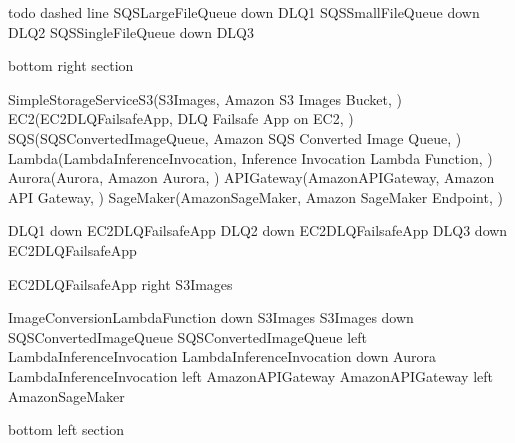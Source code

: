 \documentclass[letterpaper,10pt,english]{sphinxmanual}
\begin{document}
\begin{sphinxVerbatim}[commandchars=\\\{\},numbers=left,firstnumber=1,stepnumber=1]
\PYGZsq{}todo dashed line
SQSLargeFileQueue \PYGZhy{}down\PYGZhy{}\PYGZgt{} DLQ1
SQSSmallFileQueue \PYGZhy{}down\PYGZhy{}\PYGZgt{} DLQ2
SQSSingleFileQueue \PYGZhy{}down\PYGZhy{}\PYGZgt{} DLQ3


\PYGZsq{}bottom right section 
\PYGZsq{}\PYGZhy{}\PYGZhy{}\PYGZhy{}\PYGZhy{}\PYGZhy{}\PYGZhy{}\PYGZhy{}\PYGZhy{}\PYGZhy{}\PYGZhy{}\PYGZhy{}\PYGZhy{}\PYGZhy{}\PYGZhy{}\PYGZhy{}\PYGZhy{}\PYGZhy{}\PYGZhy{}\PYGZhy{}\PYGZhy{}\PYGZhy{}\PYGZhy{}\PYGZhy{}\PYGZhy{}\PYGZhy{}\PYGZhy{}\PYGZhy{}\PYGZhy{}\PYGZhy{}\PYGZhy{}\PYGZhy{}\PYGZhy{}\PYGZhy{}\PYGZhy{}\PYGZhy{}\PYGZhy{}\PYGZhy{}\PYGZhy{}\PYGZhy{}\PYGZhy{}\PYGZhy{}\PYGZhy{}\PYGZhy{}\PYGZhy{}\PYGZhy{}\PYGZhy{}\PYGZhy{}\PYGZhy{}\PYGZhy{}\PYGZhy{}\PYGZhy{}\PYGZhy{}\PYGZhy{}\PYGZhy{}\PYGZhy{}\PYGZhy{}\PYGZhy{}\PYGZhy{}\PYGZhy{}\PYGZhy{}\PYGZhy{}

SimpleStorageServiceS3(S3Images, \PYGZdq{}Amazon S3 Images Bucket\PYGZdq{}, \PYGZdq{} \PYGZdq{})
EC2(EC2DLQFailsafeApp, \PYGZdq{}DLQ Failsafe App on EC2\PYGZdq{}, \PYGZdq{} \PYGZdq{})
SQS(SQSConvertedImageQueue, \PYGZdq{}Amazon SQS Converted Image Queue\PYGZdq{}, \PYGZdq{} \PYGZdq{})
Lambda(LambdaInferenceInvocation, \PYGZdq{}Inference Invocation Lambda Function\PYGZdq{}, \PYGZdq{} \PYGZdq{})
Aurora(Aurora, \PYGZdq{}Amazon Aurora\PYGZdq{}, \PYGZdq{} \PYGZdq{})
APIGateway(AmazonAPIGateway, \PYGZdq{}Amazon API Gateway\PYGZdq{}, \PYGZdq{}\PYGZdq{})
SageMaker(AmazonSageMaker, \PYGZdq{}Amazon SageMaker Endpoint\PYGZdq{}, \PYGZdq{}\PYGZdq{})

DLQ1 \PYGZhy{}down\PYGZhy{}\PYGZgt{} EC2DLQFailsafeApp
DLQ2 \PYGZhy{}down\PYGZhy{}\PYGZgt{} EC2DLQFailsafeApp
DLQ3 \PYGZhy{}down\PYGZhy{}\PYGZgt{} EC2DLQFailsafeApp

EC2DLQFailsafeApp \PYGZhy{}right\PYGZhy{}\PYGZgt{} S3Images

ImageConversionLambdaFunction \PYGZhy{}down\PYGZhy{}\PYGZgt{} S3Images
S3Images \PYGZhy{}down\PYGZhy{}\PYGZgt{} SQSConvertedImageQueue
SQSConvertedImageQueue \PYGZhy{}left\PYGZhy{}\PYGZgt{} LambdaInferenceInvocation
LambdaInferenceInvocation \PYGZhy{}down\PYGZhy{}\PYGZgt{} Aurora
LambdaInferenceInvocation \PYGZlt{}\PYGZhy{}left\PYGZhy{}\PYGZgt{} AmazonAPIGateway
AmazonAPIGateway \PYGZlt{}\PYGZhy{}left\PYGZhy{}\PYGZgt{} AmazonSageMaker


\PYGZsq{}bottom left section 
\PYGZsq{}\PYGZhy{}\PYGZhy{}\PYGZhy{}\PYGZhy{}\PYGZhy{}\PYGZhy{}\PYGZhy{}\PYGZhy{}\PYGZhy{}\PYGZhy{}\PYGZhy{}\PYGZhy{}\PYGZhy{}\PYGZhy{}\PYGZhy{}\PYGZhy{}\PYGZhy{}\PYGZhy{}\PYGZhy{}\PYGZhy{}\PYGZhy{}\PYGZhy{}\PYGZhy{}\PYGZhy{}\PYGZhy{}\PYGZhy{}\PYGZhy{}\PYGZhy{}\PYGZhy{}\PYGZhy{}\PYGZhy{}\PYGZhy{}\PYGZhy{}\PYGZhy{}\PYGZhy{}\PYGZhy{}\PYGZhy{}\PYGZhy{}\PYGZhy{}\PYGZhy{}\PYGZhy{}\PYGZhy{}\PYGZhy{}\PYGZhy{}\PYGZhy{}\PYGZhy{}\PYGZhy{}\PYGZhy{}\PYGZhy{}\PYGZhy{}\PYGZhy{}\PYGZhy{}\PYGZhy{}\PYGZhy{}\PYGZhy{}\PYGZhy{}\PYGZhy{}\PYGZhy{}\PYGZhy{}\PYGZhy{}\PYGZhy{}


\end{sphinxVerbatim}
\end{document}
